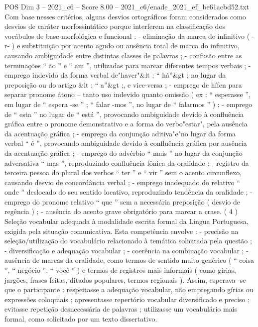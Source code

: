 \begin{textsample}{POS Dim 3 – 2021\_c6 – Score 8.00 – 2021\_c6/enade\_2021\_ef\_be61acbd52.txt}
Com base nesses critérios, alguns desvios ortográficos foram considerados como desvios de caráter morfossintático porque interferem na classificação dos vocábulos de base morfológica e funcional : - eliminação da marca de infinitivo ( -r- ) e substituição por acento agudo ou ausência total de marca do infinitivo, causando ambiguidade entre distintas classes de palavras ; - confusão entre as terminações “ ão ” e “ am ”, utilizadas para marcar diferentes tempos verbais ; - emprego indevido da forma verbal de"haver"\&lt ; “ há”\&gt ; no lugar da preposição ou do artigo \&lt ; “ a”\&gt ;, e vice-versa ; - emprego de hífen para separar pronome átono – tanto uso indevido quanto omissão ( ex : “ esperasse ”, em lugar de “ espera -se ” ; “ falar -mos ”, no lugar de “ falarmos ” ) ; - emprego de “ esta ” no lugar de “ está ”, provocando ambiguidade devido à confluência gráfica entre o pronome demonstrativo e a forma do verbo"estar", pela ausência da acentuação gráfica ; - emprego da conjunção aditiva"e"no lugar da forma verbal “ é ”, provocando ambiguidade devido à confluência gráfica por ausência da acentuação gráfica ; - emprego do advérbio “ mais ” no lugar da conjunção adversativa “ mas ”, reproduzindo confluência fônica da oralidade ; - registro da terceira pessoa do plural dos verbos “ ter ” e “ vir ” sem o acento circunflexo, causando desvio de concordância verbal ; - emprego inadequado do relativo “ onde ” deslocado do seu sentido locativo, reproduzindo tendência da oralidade ; - emprego do pronome relativo “ que ” sem a necessária preposição ( desvio de regência ) ; - ausência do acento grave obrigatório para marcar a crase. ( 4 ) Seleção vocabular adequada à modalidade escrita formal da Língua Portuguesa, exigida pela situação comunicativa.
Esta competência envolve : - precisão na seleção/utilização do vocabulário relacionado à temática solicitada pela questão ; - diversificação e adequação vocabular ; - coerência na combinação vocabular ; - ausência de marcas da oralidade, como termos de sentido muito genérico ( “ coisa ”, “ negócio ”, “ você ” ) e termos de registros mais informais ( como gírias, jargões, frases feitas, ditados populares, termos regionais ).
Assim, esperava -se que o participante : respeitasse a adequação vocabular, não empregando gírias ou expressões coloquiais ; apresentasse repertório vocabular diversificado e preciso ; evitasse repetição desnecessária de palavras ; utilizasse um vocabulário mais formal, como solicitado por um texto dissertativo.

\end{textsample}
